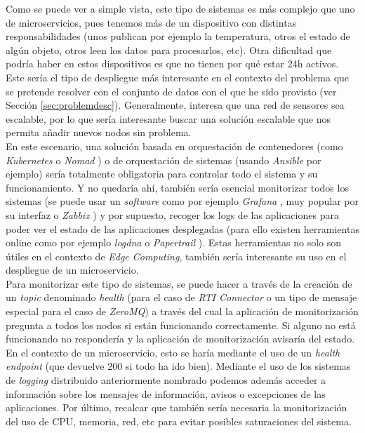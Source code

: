Como se puede ver a simple vista, este tipo de sistemas es más complejo que uno de microservicios, pues tenemos más de un dispositivo con distintas responsabilidades (unos publican por ejemplo la temperatura, otros el estado de algún objeto, otros leen los datos para procesarlos, etc). Otra dificultad que podría haber en estos dispositivos es que no tienen por qué estar 24h activos.\\

Este sería el tipo de despliegue más interesante en el contexto del problema que se pretende resolver con el conjunto de datos con el que he sido provisto (ver Sección \ref{sec:problemdesc}). Generalmente, interesa que una red de sensores sea escalable, por lo que sería interesante buscar una solución escalable que nos permita añadir nuevos nodos sin problema.\\

En este escenario, una solución basada en orquestación de contenedores (como \textit{Kubernetes} \cite{kubernetes} o \textit{Nomad} \cite{nomad}) o de orquestación de sistemas (usando \textit{Ansible} por ejemplo) sería totalmente obligatoria para controlar todo el sistema y su funcionamiento. Y no quedaría ahí, también sería esencial monitorizar todos los sistemas (se puede usar un \textit{software} como por ejemplo \textit{Grafana} \cite{grafana}, muy popular por su interfaz o \textit{Zabbix} \cite{zabbix}) y por supuesto, recoger los logs de las aplicaciones para poder ver el estado de las aplicaciones desplegadas (para ello existen herramientas online como por ejemplo \textit{logdna} \cite{logdna} o \textit{Papertrail} \cite{papertrail}). Estas herramientas no solo son útiles en el contexto de \textit{Edge Computing}, también sería interesante su uso en el despliegue de un microservicio.\\

Para monitorizar este tipo de sistemas, se puede hacer a través de la creación de un \textit{topic} denominado \textit{health} (para el caso de \textit{RTI Connector} o un tipo de mensaje especial para el caso de \textit{ZeroMQ}) a través del cual la aplicación de monitorización pregunta a todos los nodos si están funcionando correctamente. Si alguno no está funcionando no respondería y la aplicación de monitorización avisaría del estado. En el contexto de un microservicio, esto se haría mediante el uso de un \textit{health endpoint} (que devuelve 200 si todo ha ido bien). Mediante el uso de los sistemas de \textit{logging} distribuido anteriormente nombrado podemos además acceder a información sobre los mensajes de información, avisos o excepciones de las aplicaciones. Por último, recalcar que también sería necesaria la monitorización del uso de CPU, memoria, red, etc para evitar posibles saturaciones del sistema.
